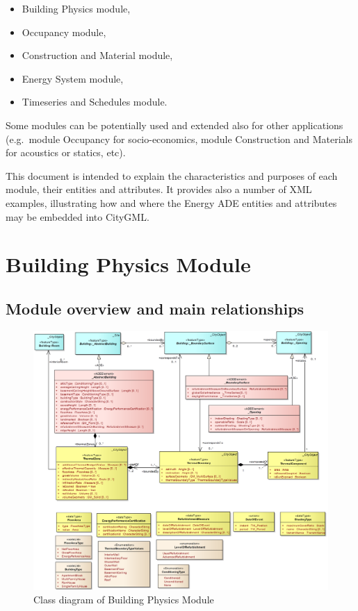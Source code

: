 \documentclass[a4paper,12pt]{article}
\providecommand{\tightlist}{%
  \setlength{\itemsep}{0pt}\setlength{\parskip}{0pt}}
\let\stdsection\section%
\renewcommand\section{\newpage\stdsection}
\begin{document}
\begin{itemize}
\tightlist
\item
  Building Physics module,
\item
  Occupancy module,
\item
  Construction and Material module,
\item
  Energy System module,
\item
  Timeseries and Schedules module.
\end{itemize}

Some modules can be potentially used and extended also for other
applications (e.g.~module Occupancy for socio-economics, module
Construction and Materials for acoustics or statics, etc).

This document is intended to explain the characteristics and purposes of
each module, their entities and attributes. It provides also a number of
XML examples, illustrating how and where the Energy ADE entities and
attributes may be embedded into CityGML.

\section{Building Physics Module}\label{building-physics-module}

\subsection{Module overview and main
relationships}\label{module-overview-and-main-relationships}

\begin{figure}[htbp]
\centering
\includegraphics{fig/class_geometry.png}
\caption{Class diagram of Building Physics Module}
\end{figure}
\end{document}
